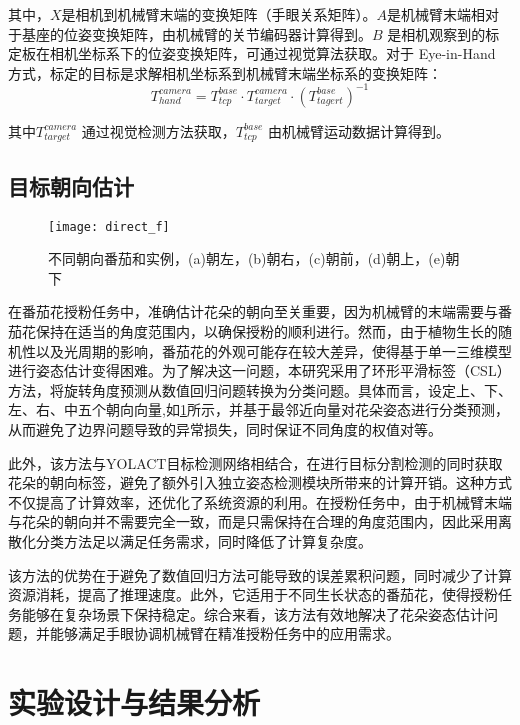 其中，$X$是相机到机械臂末端的变换矩阵（手眼关系矩阵）。$A$是机械臂末端相对于基座的位姿变换矩阵，由机械臂的关节编码器计算得到。$B$ 是相机观察到的标定板在相机坐标系下的位姿变换矩阵，可通过视觉算法获取。对于 Eye-in-Hand 方式，标定的目标是求解相机坐标系到机械臂末端坐标系的变换矩阵：
\begin{equation}
	\label{equ:hand-in-eye2}
	T_{hand}^{camera} = T_{tcp}^{base}\cdot T_{target}^{camera} \cdot(T_{tagert}^{base})^{-1}
\end{equation}

其中$T_{target}^{camera} $ 通过视觉检测方法获取，$T_{tcp}^{base}$ 由机械臂运动数据计算得到。



\subsection{目标朝向估计}
 \begin{figure}[htb]
	\texttt{[image: direct\_f]}
	\caption[不同朝向番茄和实例]{不同朝向番茄和实例，(a)朝左，(b)朝右，(c)朝前，(d)朝上，(e)朝下} %
	\label{fig:direction_f}
\end{figure}
在番茄花授粉任务中，准确估计花朵的朝向至关重要，因为机械臂的末端需要与番茄花保持在适当的角度范围内，以确保授粉的顺利进行。然而，由于植物生长的随机性以及光周期的影响，番茄花的外观可能存在较大差异，使得基于单一三维模型进行姿态估计变得困难。为了解决这一问题，本研究采用了环形平滑标签（CSL）方法，将旋转角度预测从数值回归问题转换为分类问题。具体而言，设定上、下、左、右、中五个朝向向量,如\cref{fig:direction_f}所示，并基于最邻近向量对花朵姿态进行分类预测，从而避免了边界问题导致的异常损失，同时保证不同角度的权值对等。

此外，该方法与YOLACT目标检测网络相结合，在进行目标分割检测的同时获取花朵的朝向标签，避免了额外引入独立姿态检测模块所带来的计算开销。这种方式不仅提高了计算效率，还优化了系统资源的利用。在授粉任务中，由于机械臂末端与花朵的朝向并不需要完全一致，而是只需保持在合理的角度范围内，因此采用离散化分类方法足以满足任务需求，同时降低了计算复杂度。

该方法的优势在于避免了数值回归方法可能导致的误差累积问题，同时减少了计算资源消耗，提高了推理速度。此外，它适用于不同生长状态的番茄花，使得授粉任务能够在复杂场景下保持稳定。综合来看，该方法有效地解决了花朵姿态估计问题，并能够满足手眼协调机械臂在精准授粉任务中的应用需求。

\section{实验设计与结果分析}

